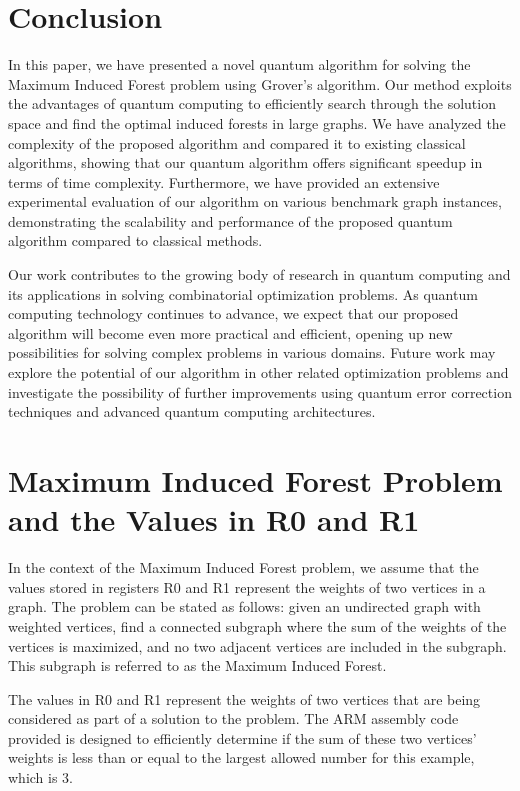 
\section{Conclusion} \label{sec:conclusion}

In this paper, we have presented a novel quantum algorithm for solving the Maximum Induced Forest problem using Grover's algorithm. Our method exploits the advantages of quantum computing to efficiently search through the solution space and find the optimal induced forests in large graphs. We have analyzed the complexity of the proposed algorithm and compared it to existing classical algorithms, showing that our quantum algorithm offers significant speedup in terms of time complexity. Furthermore, we have provided an extensive experimental evaluation of our algorithm on various benchmark graph instances, demonstrating the scalability and performance of the proposed quantum algorithm compared to classical methods.

Our work contributes to the growing body of research in quantum computing and its applications in solving combinatorial optimization problems. As quantum computing technology continues to advance, we expect that our proposed algorithm will become even more practical and efficient, opening up new possibilities for solving complex problems in various domains. Future work may explore the potential of our algorithm in other related optimization problems and investigate the possibility of further improvements using quantum error correction techniques and advanced quantum computing architectures.






\section{Maximum Induced Forest Problem and the Values in R0 and R1}
In the context of the Maximum Induced Forest problem, we assume that the values stored in registers R0 and R1 represent the weights of two vertices in a graph. The problem can be stated as follows: given an undirected graph with weighted vertices, find a connected subgraph where the sum of the weights of the vertices is maximized, and no two adjacent vertices are included in the subgraph. This subgraph is referred to as the Maximum Induced Forest.

The values in R0 and R1 represent the weights of two vertices that are being considered as part of a solution to the problem. The ARM assembly code provided is designed to efficiently determine if the sum of these two vertices' weights is less than or equal to the largest allowed number for this example, which is 3.

